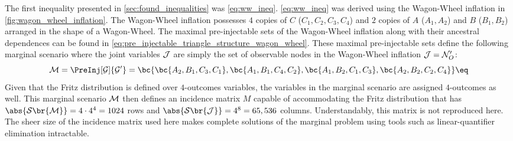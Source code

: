 \documentclass[aps, 10pt, english, twoside, pra, nofootinbib, tightenlines, longbibliography, superscriptaddress]{revtex4-1}
\renewcommand{\Events}[1]{\mathcal{S}\br{#1}} %
\begin{document}
    The first inequality presented in \cref{sec:found_inequalities} was \cref{eq:ww_ineq}. \cref{eq:ww_ineq} was derived using the Wagon-Wheel inflation in \cref{fig:wagon_wheel_inflation}. The Wagon-Wheel inflation possesses $4$ copies of $C$ ($C_1, C_2, C_3, C_4$) and $2$ copies of $A$ ($A_1, A_2$) and $B$ ($B_1, B_2$) arranged in the shape of a Wagon-Wheel. The maximal pre-injectable sets of the Wagon-Wheel inflation along with their ancestral dependences can be found in \cref{eq:pre_injectable_triangle_structure_wagon_wheel}. These maximal pre-injectable sets define the following marginal scenario where the joint variables $\mathcal{J}$ are simply the set of observable nodes in the Wagon-Wheel inflation $\mathcal{J} = \mathcal{N}'_O$:
    \[ \mscenario = \PreInj[\graph]{\graph'} = \bc{\bc{A_2, B_1, C_3, C_1}, \bc{A_1, B_1, C_4, C_2}, \bc{A_1, B_2, C_1, C_3}, \bc{A_2, B_2, C_2, C_4}} \eq \label{eq:wagon_wheel_marginal_model}\]
    Given that the Fritz distribution is defined over $4$-outcomes variables, the variables in the marginal scenario are assigned $4$-outcomes as well. This marginal scenario $\mathcal{M}$ then defines an incidence matrix $M$ capable of accommodating the Fritz distribution that has $\abs{\Events{\mscenario}} = 4 \cdot 4^{4} = 1024$ rows and $\abs{\Events{\jointvar}} = 4^8 = 65,536$ columns. Understandably, this matrix is not reproduced here. The sheer size of the incidence matrix used here makes complete solutions of the marginal problem using tools such as linear-quantifier elimination intractable.
\end{document}
